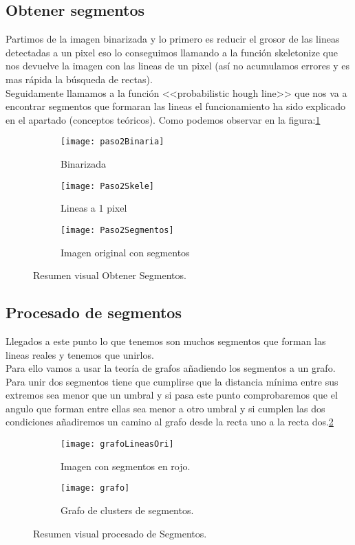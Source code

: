 \subsection{Obtener segmentos}
Partimos de la imagen binarizada y lo primero es reducir el grosor de las lineas detectadas a un pixel eso lo conseguimos llamando a la función skeletonize que nos devuelve la imagen con las lineas de un pixel (así no acumulamos errores y es mas rápida la búsqueda de rectas).\\
Seguidamente llamamos a la función <<probabilistic hough line>> que nos va a encontrar segmentos que formaran las lineas el funcionamiento ha sido explicado en el apartado (conceptos teóricos). Como podemos observar en la figura:\ref{fig:5.5}


\begin{figure}
\begin{subfigure}[c]{.5\linewidth}
\centering\large \texttt{[image: paso2Binaria]}
\caption{Binarizada}
\end{subfigure}%
\begin{subfigure}[c]{.5\linewidth}
\centering\large \texttt{[image: Paso2Skele]}
\caption{Lineas a 1 pixel}
\end{subfigure}
\begin{subfigure}[c]{.5\linewidth}
\centering\large \texttt{[image: Paso2Segmentos]}
\caption{Imagen original con segmentos}
\end{subfigure}
\caption{Resumen visual Obtener Segmentos.}\label{fig:5.5}
\end{figure}

\subsection{Procesado de segmentos}
Llegados a este punto lo que tenemos son muchos segmentos que forman las lineas reales y tenemos que unirlos.\\
Para ello vamos a usar la teoría de grafos añadiendo los segmentos a un grafo.\\
Para unir dos segmentos tiene que cumplirse que la distancia mínima entre sus extremos sea menor que un umbral y si pasa este punto comprobaremos que el angulo que forman entre ellas sea menor a otro umbral y si cumplen las dos condiciones añadiremos un camino al grafo desde la recta uno a la recta dos.\ref{fig:5.6}



\begin{figure}
\begin{subfigure}[b]{.5\linewidth}
\centering\large \texttt{[image: grafoLineasOri]}
\caption{Imagen con segmentos en rojo.}
\end{subfigure}
\begin{subfigure}[b]{.5\linewidth}
\centering\large \texttt{[image: grafo]}
\caption{Grafo de clusters de segmentos.}
\end{subfigure}
\caption{Resumen visual procesado de Segmentos.}\label{fig:5.6}
\end{figure}

